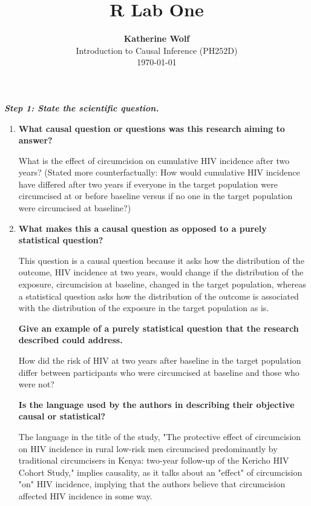 \documentclass{article}
\title{\textbf{R Lab One}}
\author{\textbf{Katherine Wolf}\\ Introduction to Causal Inference (PH252D)\\ \today}
\date{}
\begin{document}
\maketitle

\vspace{2mm}

\textbf{\textit{Step 1: State the scientific question.}}

\begin{enumerate}[label=\textbf{(\alph*)}]

  \item \textbf{What causal question or questions was this research aiming to answer?}
  
  What is the effect of circumcision on cumulative HIV incidence after two years?  (Stated more counterfactually: How would cumulative HIV incidence have differed after two years if everyone in the target population were circumcised at or before baseline versus if no one in the target population were circumcised at baseline?)
  
  \item \textbf{What makes this a causal question as opposed to a purely statistical question?}
  
  This question is a causal question because it asks how the distribution of the outcome, HIV incidence at two years, would change if the distribution of the exposure, circumcision at baseline, changed in the target population, whereas a statistical question asks how the distribution of the outcome is associated with the distribution of the exposure in the target population as is.
  
  \textbf{Give an example of a purely statistical question that the research described could address.}

  How did the risk of HIV at two years after baseline in the target population differ between participants who were circumcised at baseline and those who were not?

  \textbf{Is the language used by the authors in describing their objective causal or statistical?}
  
  The language in the title of the study, "The protective effect of circumcision on HIV incidence in rural low-risk men circumcised predominantly by traditional circumcisers in Kenya: two-year follow-up of the Kericho HIV Cohort Study," implies causality, as it talks about an "effect" of circumcision "on" HIV incidence, implying that the authors believe that circumcision affected HIV incidence in some way. 
  

\end{enumerate}
\end{document}
